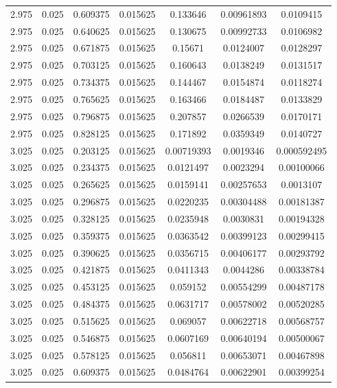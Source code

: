 \begin{table}[bh]
\begin{center}
{\begin{tabular}{ccccccc}
2.975	 & 0.025 & 	0.609375	 & 0.015625	 & 0.133646	 & 0.00961893	 & 0.0109415 \\ 
2.975	 & 0.025 & 	0.640625	 & 0.015625	 & 0.130675	 & 0.00992733	 & 0.0106982 \\ 
2.975	 & 0.025 & 	0.671875	 & 0.015625	 & 0.15671	 & 0.0124007	 & 0.0128297 \\ 
2.975	 & 0.025 & 	0.703125	 & 0.015625	 & 0.160643	 & 0.0138249	 & 0.0131517 \\ 
2.975	 & 0.025 & 	0.734375	 & 0.015625	 & 0.144467	 & 0.0154874	 & 0.0118274 \\ 
2.975	 & 0.025 & 	0.765625	 & 0.015625	 & 0.163466	 & 0.0184487	 & 0.0133829 \\ 
2.975	 & 0.025 & 	0.796875	 & 0.015625	 & 0.207857	 & 0.0266539	 & 0.0170171 \\ 
2.975	 & 0.025 & 	0.828125	 & 0.015625	 & 0.171892	 & 0.0359349	 & 0.0140727 \\ 
3.025	 & 0.025 & 	0.203125	 & 0.015625	 & 0.00719393	 & 0.0019346	 & 0.000592495 \\ 
3.025	 & 0.025 & 	0.234375	 & 0.015625	 & 0.0121497	 & 0.0023294	 & 0.00100066 \\ 
3.025	 & 0.025 & 	0.265625	 & 0.015625	 & 0.0159141	 & 0.00257653	 & 0.0013107 \\ 
3.025	 & 0.025 & 	0.296875	 & 0.015625	 & 0.0220235	 & 0.00304488	 & 0.00181387 \\ 
3.025	 & 0.025 & 	0.328125	 & 0.015625	 & 0.0235948	 & 0.0030831	 & 0.00194328 \\ 
3.025	 & 0.025 & 	0.359375	 & 0.015625	 & 0.0363542	 & 0.00399123	 & 0.00299415 \\ 
3.025	 & 0.025 & 	0.390625	 & 0.015625	 & 0.0356715	 & 0.00406177	 & 0.00293792 \\ 
3.025	 & 0.025 & 	0.421875	 & 0.015625	 & 0.0411343	 & 0.0044286	 & 0.00338784 \\ 
3.025	 & 0.025 & 	0.453125	 & 0.015625	 & 0.059152	 & 0.00554299	 & 0.00487178 \\ 
3.025	 & 0.025 & 	0.484375	 & 0.015625	 & 0.0631717	 & 0.00578002	 & 0.00520285 \\ 
3.025	 & 0.025 & 	0.515625	 & 0.015625	 & 0.069057	 & 0.00622718	 & 0.00568757 \\ 
3.025	 & 0.025 & 	0.546875	 & 0.015625	 & 0.0607169	 & 0.00640194	 & 0.00500067 \\ 
3.025	 & 0.025 & 	0.578125	 & 0.015625	 & 0.056811	 & 0.00653071	 & 0.00467898 \\ 
3.025	 & 0.025 & 	0.609375	 & 0.015625	 & 0.0484764	 & 0.00622901	 & 0.00399254 \\ 

\end{tabular}}
\end{center}
\end{table}
